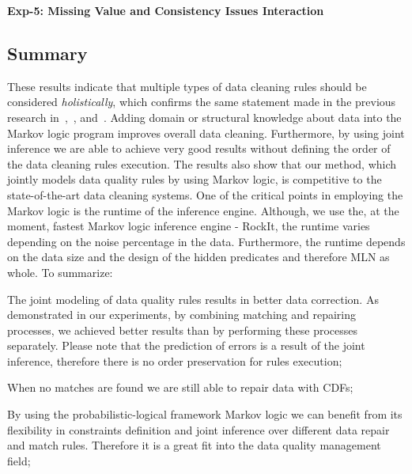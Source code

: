 
\textbf{Exp-5: Missing Value and Consistency Issues Interaction}



\subsection{Summary}
These results indicate that multiple types of data cleaning rules should be considered \textit{holistically}, which confirms the same statement made in the previous research in~\cite{Dallachiesa:2013:NCD:2463676.2465327},~\cite{Fan:2014:IRM:2628135.2567657}, and~\cite{Fan:2011:IRM:1989323.1989373}. Adding domain or structural knowledge about data into the Markov logic program improves overall data cleaning. Furthermore, by using joint inference we are able to achieve very good results without defining the order of the data cleaning rules execution. The results also show that our method, which jointly models data quality rules by using Markov logic, is competitive to the state-of-the-art data cleaning systems. One of the critical points in employing the Markov logic is the runtime of the inference engine. Although, we use the, at the moment, fastest Markov logic inference engine - RockIt, the runtime varies depending on the noise percentage in the data. Furthermore, the runtime depends on the data size and the design of the hidden predicates and therefore MLN as whole.
To summarize:
\begin{inparaenum}[\itshape 1\upshape)]    
    	\item The joint modeling of data quality rules results in better data correction. As demonstrated in our experiments, by combining matching and repairing processes, we achieved better results than by performing these processes separately. Please note that the prediction of errors is a result of the joint inference, therefore there is no order preservation for rules execution;
    	\item When no matches are found we are still able to repair data with CDFs; 
    	\item By using the probabilistic-logical framework Markov logic we can benefit from its flexibility in constraints definition and joint inference over different data repair and match rules. Therefore it is a great fit into the data quality management field;
\end{inparaenum}


